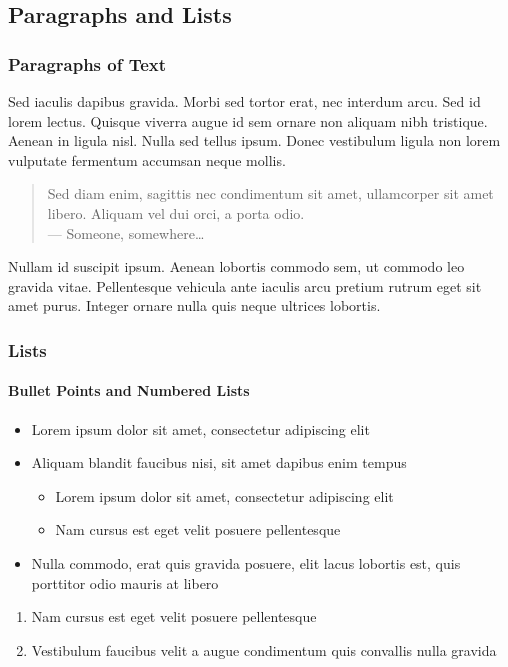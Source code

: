 \documentclass[
	11pt, %
]{beamer}
\begin{document}

\subsection{Paragraphs and Lists}

\begin{frame}
	\frametitle{Paragraphs of Text}
	
	Sed iaculis \alert{dapibus gravida}. Morbi sed tortor erat, nec interdum arcu. Sed id lorem lectus. Quisque viverra augue id sem ornare non aliquam nibh tristique. Aenean in ligula nisl. Nulla sed tellus ipsum. Donec vestibulum ligula non lorem vulputate fermentum accumsan neque mollis.
	
	\bigskip %
	
	\begin{quote}
		Sed diam enim, sagittis nec condimentum sit amet, ullamcorper sit amet libero. Aliquam vel dui orci, a porta odio.\\
		--- Someone, somewhere\ldots
	\end{quote}
	
	\bigskip %
	
	Nullam id suscipit ipsum. Aenean lobortis commodo sem, ut commodo leo gravida vitae. Pellentesque vehicula ante iaculis arcu pretium rutrum eget sit amet purus. Integer ornare nulla quis neque ultrices lobortis.
\end{frame}


\begin{frame}
	\frametitle{Lists}
	\framesubtitle{Bullet Points and Numbered Lists} %
	
	\begin{itemize}
		\item Lorem ipsum dolor sit amet, consectetur adipiscing elit
		\item Aliquam blandit faucibus nisi, sit amet dapibus enim tempus
		\begin{itemize}
			\item Lorem ipsum dolor sit amet, consectetur adipiscing elit
			\item Nam cursus est eget velit posuere pellentesque
		\end{itemize}
		\item Nulla commodo, erat quis gravida posuere, elit lacus lobortis est, quis porttitor odio mauris at libero
	\end{itemize}
	
	\bigskip %
	
	\begin{enumerate}
		\item Nam cursus est eget velit posuere pellentesque
		\item Vestibulum faucibus velit a augue condimentum quis convallis nulla gravida 
	\end{enumerate}
\end{frame}
\end{document}
